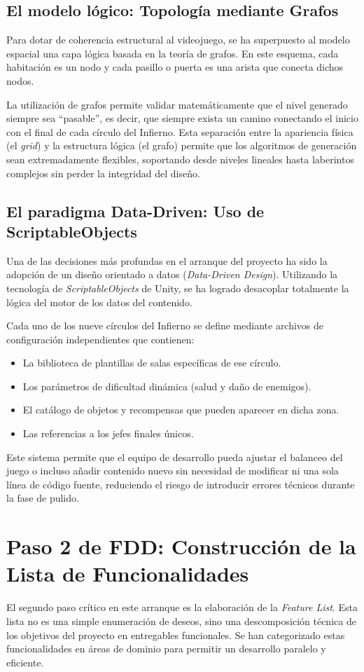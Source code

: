 \subsection{El modelo lógico: Topología mediante Grafos}
Para dotar de coherencia estructural al videojuego, se ha superpuesto al modelo espacial una capa lógica basada en la teoría de grafos. En este esquema, cada habitación es un nodo y cada pasillo o puerta es una arista que conecta dichos nodos.

La utilización de grafos permite validar matemáticamente que el nivel generado siempre sea ``pasable'', es decir, que siempre exista un camino conectando el inicio con el final de cada círculo del Infierno. Esta separación entre la apariencia física (el \textit{grid}) y la estructura lógica (el grafo) permite que los algoritmos de generación sean extremadamente flexibles, soportando desde niveles lineales hasta laberintos complejos sin perder la integridad del diseño.

\subsection{El paradigma Data-Driven: Uso de ScriptableObjects}
Una de las decisiones más profundas en el arranque del proyecto ha sido la adopción de un diseño orientado a datos (\textit{Data-Driven Design}). Utilizando la tecnología de \textit{ScriptableObjects} de Unity, se ha logrado desacoplar totalmente la lógica del motor de los datos del contenido.

Cada uno de los nueve círculos del Infierno se define mediante archivos de configuración independientes que contienen:
\begin{itemize}
    \item La biblioteca de plantillas de salas específicas de ese círculo.
    \item Los parámetros de dificultad dinámica (salud y daño de enemigos).
    \item El catálogo de objetos y recompensas que pueden aparecer en dicha zona.
    \item Las referencias a los jefes finales únicos.
\end{itemize}
Este sistema permite que el equipo de desarrollo pueda ajustar el balanceo del juego o incluso añadir contenido nuevo sin necesidad de modificar ni una sola línea de código fuente, reduciendo el riesgo de introducir errores técnicos durante la fase de pulido.

\section{Paso 2 de FDD: Construcción de la Lista de Funcionalidades}
El segundo paso crítico en este arranque es la elaboración de la \textit{Feature List}. Esta lista no es una simple enumeración de deseos, sino una descomposición técnica de los objetivos del proyecto en entregables funcionales. Se han categorizado estas funcionalidades en áreas de dominio para permitir un desarrollo paralelo y eficiente.

